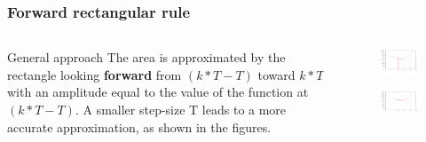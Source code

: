\begin{frame}
	\frametitle{Forward rectangular rule}
\begin{columns}
	
	\begin{column}{0.5\textwidth}
	\begin{block}{General approach}
		The area is approximated by the rectangle looking \textbf{forward} from $(k*T - T)$ toward $k*T$ with an amplitude equal to the value of the function at $(k*T - T)$. A smaller step-size T leads to a more accurate approximation, as shown in the figures.
	\end{block}
	\end{column}

	\begin{column}{0.5\textwidth}
		\vspace{-1em}
		\begin{figure}
			\centering
			\includegraphics[width=1\linewidth]{Rectangle_Rule_3}
		\end{figure}
		\vspace{-2em}
		\begin{figure}
			\centering
			\includegraphics[width=1\linewidth]{Rectangle_Rule_4}
		\end{figure}
	\end{column}
\end{columns}
\end{frame}

